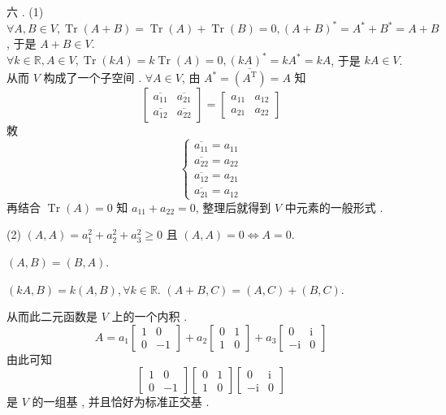 \documentclass[10pt]{article}
\begin{document}
 六 . (1) $\forall A, B \in V, \operatorname{Tr}(A+B)=\operatorname{Tr}(A)+\operatorname{Tr}(B)=0,(A+B)^{*}=A^{*}+B^{*}=A+B$,  于是  $A+B \in V$. $\forall k \in \mathbb{R}, A \in V, \operatorname{Tr}(k A)=k \operatorname{Tr}(A)=0,(k A)^{*}=k A^{*}=k A$,  于是  $k A \in V$.  从而  $V$  构成了一个子空间 . $\forall A \in V$,  由  $A^{*}=\overline{\left(A^{\mathrm{T}}\right)}=A$  知 
$$
\left[\begin{array}{ll}
\overline{a_{11}} & \overline{a_{21}} \\
\overline{a_{12}} & \overline{a_{22}}
\end{array}\right]=\left[\begin{array}{ll}
a_{11} & a_{12} \\
a_{21} & a_{22}
\end{array}\right]
$$
 敇 
$$
\left\{\begin{array}{l}
\overline{a_{11}}=a_{11} \\
\overline{a_{22}}=a_{22} \\
\overline{a_{12}}=a_{21} \\
\overline{a_{21}}=a_{12}
\end{array}\right.
$$
 再结合  $\operatorname{Tr}(A)=0$  知  $a_{11}+a_{22}=0$,  整理后就得到  $V$  中元素的一般形式 .

(2) $(A, A)=a_{1}^{2}+a_{2}^{2}+a_{3}^{2} \geqslant 0$  且  $(A, A)=0 \Longleftrightarrow A=0$.

$(A, B)=(B, A)$.

$(k A, B)=k(A, B), \forall k \in \mathbb{R} .$ $(A+B, C)=(A, C)+(B, C) .$

 从而此二元函数是  $V$  上的一个内积 .
$$
A=a_{1}\left[\begin{array}{cc}
1 & 0 \\
0 & -1
\end{array}\right]+a_{2}\left[\begin{array}{ll}
0 & 1 \\
1 & 0
\end{array}\right]+a_{3}\left[\begin{array}{cc}
0 & \mathrm{i} \\
-\mathrm{i} & 0
\end{array}\right]
$$
 由此可知 
$$
\left[\begin{array}{cc}
1 & 0 \\
0 & -1
\end{array}\right]\left[\begin{array}{ll}
0 & 1 \\
1 & 0
\end{array}\right]\left[\begin{array}{cc}
0 & \mathrm{i} \\
-\mathrm{i} & 0
\end{array}\right]
$$
 是  $V$  的一组基 ,  并且恰好为标准正交基 .
\end{document}
